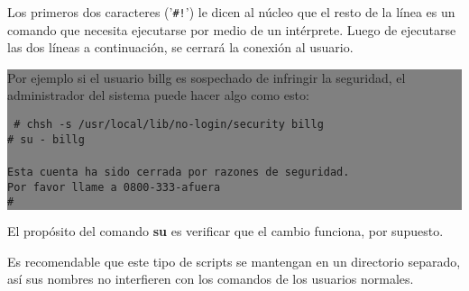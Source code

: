 \documentclass[12pt]{article}
\begin{document}
Los primeros dos caracteres ('\texttt{\#!}') le dicen al núcleo que el
resto de la línea es un comando que necesita ejecutarse por medio de un
intérprete. Luego de ejecutarse las dos líneas a continuación, 
se cerrará la conexión al usuario. 

\colorbox{grey}{\parbox[t]{0.95\linewidth}{ \vspace*{0.5cm} 
{
Por ejemplo si el usuario billg es sospechado
de infringir la seguridad, el administrador del sistema 
puede hacer algo como esto: 

\tt  
\# chsh -s /usr/local/lib/no-login/security billg \\
\# su - billg \\
 \\
    Esta cuenta ha sido cerrada por razones de seguridad. \\
    Por favor llame a 0800-333-afuera \\
\#  
} \vspace*{0.5cm} } } 

El propósito del comando \textbf{su} es verificar que el cambio
funciona, por supuesto.  

Es recomendable que este tipo de scripts se mantengan en un directorio
separado, así sus nombres
no interfieren con los comandos de los usuarios normales.



\end{document}
